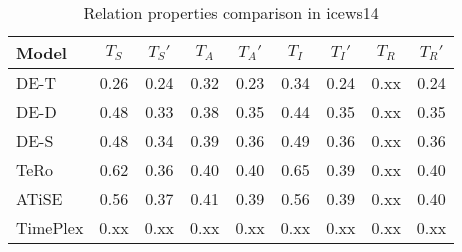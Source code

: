 \begin{table*}[htb]
\centering
\begin{minipage}{0.95\textwidth}
\centering
\caption{Relation properties comparison in icews14}
\vspace{-3mm}

\begin{tabular}{l|cc|cc|cc|cc}\hline
Model       & $T_S$ & $T_S'$ & $T_A$ & $T_A'$ & $T_I$ & $T_I'$ & $T_R$ & $T_R'$ \\ \hline
DE-T & 0.26 & 0.24 & 0.32 & 0.23 & 0.34 & 0.24 & 0.xx & 0.24 \\ 
DE-D & 0.48 & 0.33 & 0.38 & 0.35 & 0.44 & 0.35 & 0.xx & 0.35 \\ 
DE-S & 0.48 & 0.34 & 0.39 & 0.36 & 0.49 & 0.36 & 0.xx & 0.36 \\ 
TeRo & 0.62 & 0.36 & 0.40 & 0.40 & 0.65 & 0.39 & 0.xx & 0.40 \\ 
ATiSE & 0.56 & 0.37 & 0.41 & 0.39 & 0.56 & 0.39 & 0.xx & 0.40 \\ 
TimePlex & 0.xx & 0.xx & 0.xx & 0.xx & 0.xx & 0.xx & 0.xx & 0.xx \\ 
 \hline
\end{tabular}

\label{fig:relation_properties_icews14_comparison}
\end{minipage}
\end{table*}

